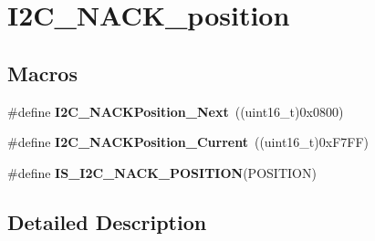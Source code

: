 \hypertarget{group___i2_c___n_a_c_k__position}{\section{I2\-C\-\_\-\-N\-A\-C\-K\-\_\-position}
\label{group___i2_c___n_a_c_k__position}
}
\subsection*{Macros}
\begin{DoxyCompactItemize}
\item 
\hypertarget{group___i2_c___n_a_c_k__position_gacb512a4bd4841a763b6ec51606687fca}{\#define {\bfseries I2\-C\-\_\-\-N\-A\-C\-K\-Position\-\_\-\-Next}~((uint16\-\_\-t)0x0800)}\label{group___i2_c___n_a_c_k__position_gacb512a4bd4841a763b6ec51606687fca}

\item 
\hypertarget{group___i2_c___n_a_c_k__position_ga8d91c1e62730a9d927ca8e9ec4f7ef8f}{\#define {\bfseries I2\-C\-\_\-\-N\-A\-C\-K\-Position\-\_\-\-Current}~((uint16\-\_\-t)0x\-F7\-F\-F)}\label{group___i2_c___n_a_c_k__position_ga8d91c1e62730a9d927ca8e9ec4f7ef8f}

\item 
\#define {\bfseries I\-S\-\_\-\-I2\-C\-\_\-\-N\-A\-C\-K\-\_\-\-P\-O\-S\-I\-T\-I\-O\-N}(P\-O\-S\-I\-T\-I\-O\-N)
\end{DoxyCompactItemize}


\subsection{Detailed Description}


